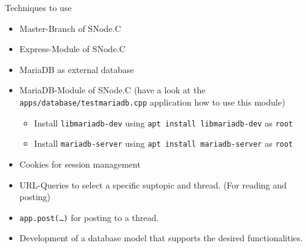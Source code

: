 ﻿\begin{frame}{Techniques to use}
  \begin{itemize}
    \item Master-Branch of SNode.C
    \item Express-Module of SNode.C
    \item MariaDB as external database
    \item MariaDB-Module of SNode.C (have a look at the {\tt apps/database/testmariadb.cpp} application how to use this module)
    \begin{itemize}
      \item Install {\tt libmariadb-dev} using {\tt apt install libmariadb-dev} as {\tt root}
      \item Install {\tt mariadb-server} using {\tt apt install mariadb-server} as {\tt root}
    \end{itemize}
    \item Cookies for session management
    \item URL-Queries to select a specific suptopic and thread. (For reading and posting)
    \item {\tt app.post(\ldots)} for posting to a thread.
    \item Development of a database model that supports the desired functionalities.
  \end{itemize}
\end{frame}
